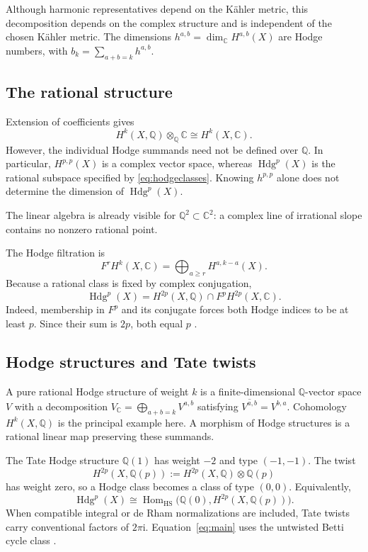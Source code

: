 \documentclass[11pt,reqno]{amsart}
\theoremstyle{definition}
\theoremstyle{remark}
\numberwithin{equation}{section}
\newcommand{\C}{\mathbb{C}}
\newcommand{\Q}{\mathbb{Q}}
\newcommand{\ii}{\mathrm{i}}
\DeclareMathOperator{\Hdg}{Hdg}
\DeclareMathOperator{\Hom}{Hom}
\begin{document}
Although harmonic representatives depend on the K\"ahler metric, this
decomposition depends on the complex structure and is independent of the
chosen K\"ahler metric. The dimensions $h^{a,b}=\dim_{\C}H^{a,b}(X)$ are
Hodge numbers, with $b_k=\sum_{a+b=k}h^{a,b}$.

\subsection{The rational structure}

Extension of coefficients gives
\[
 H^k(X,\Q)\otimes_{\Q}\C\cong H^k(X,\C).
\]
However, the individual Hodge summands need not be defined over $\Q$.
In particular, $H^{p,p}(X)$ is a complex vector space, whereas
$\Hdg^p(X)$ is the rational subspace specified by
\eqref{eq:hodgeclasses}. Knowing $h^{p,p}$ alone does not determine the
dimension of $\Hdg^p(X)$.

The linear algebra is already visible for $\Q^2\subset\C^2$: a complex line
of irrational slope contains no nonzero rational point.

The Hodge filtration is
\[
 F^rH^k(X,\C)=\bigoplus_{a\geq r}H^{a,k-a}(X).
\]
Because a rational class is fixed by complex conjugation,
\begin{equation}\label{eq:filtration}
 \Hdg^p(X)=H^{2p}(X,\Q)\cap F^pH^{2p}(X,\C).
\end{equation}
Indeed, membership in $F^p$ and its conjugate forces both Hodge indices to
be at least $p$. Since their sum is $2p$, both equal $p$ \cite{delignecmi2006}.

\subsection{Hodge structures and Tate twists}

A pure rational Hodge structure of weight $k$ is a finite-dimensional
$\Q$-vector space $V$ with a decomposition
$V_{\C}=\bigoplus_{a+b=k}V^{a,b}$ satisfying
$\overline{V^{a,b}}=V^{b,a}$. Cohomology $H^k(X,\Q)$ is the principal
example here. A morphism of Hodge structures is a rational linear map
preserving these summands.

The Tate Hodge structure $\Q(1)$ has weight $-2$ and type $(-1,-1)$.
The twist
\[
 H^{2p}(X,\Q(p)):=H^{2p}(X,\Q)\otimes\Q(p)
\]
has weight zero, so a Hodge class becomes a class of type $(0,0)$.
Equivalently,
\[
 \Hdg^p(X)\cong
 \Hom_{\mathrm{HS}}\bigl(\Q(0),H^{2p}(X,\Q(p))\bigr).
\]
When compatible integral or de Rham normalizations are included, Tate twists
carry conventional factors of $2\pi\ii$. Equation~\eqref{eq:main} uses
the untwisted Betti cycle class \cite{deligne1982hodge}.
\end{document}
